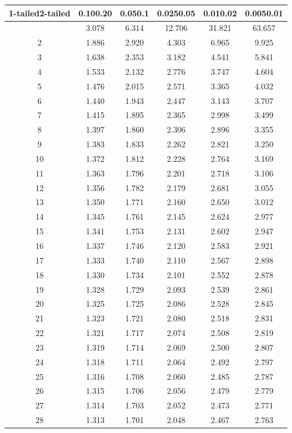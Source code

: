 \documentclass[
]{book}
\theoremstyle{definition}
\theoremstyle{definition}
\theoremstyle{definition}
\theoremstyle{definition}
\theoremstyle{remark}
\begin{document}
\begin{longtable}[]{@{}cccccc@{}}
\toprule\noalign{}
1-tailed2-tailed & 0.100.20 & 0.050.1 & 0.0250.05 & 0.010.02 & 0.0050.01 \\
\midrule\noalign{}
\endhead
\bottomrule\noalign{}
\endlastfoot
1 & 3.078 & 6.314 & 12.706 & 31.821 & 63.657 \\
2 & 1.886 & 2.920 & 4.303 & 6.965 & 9.925 \\
3 & 1.638 & 2.353 & 3.182 & 4.541 & 5.841 \\
4 & 1.533 & 2.132 & 2.776 & 3.747 & 4.604 \\
5 & 1.476 & 2.015 & 2.571 & 3.365 & 4.032 \\
6 & 1.440 & 1.943 & 2.447 & 3.143 & 3.707 \\
7 & 1.415 & 1.895 & 2.365 & 2.998 & 3.499 \\
8 & 1.397 & 1.860 & 2.306 & 2.896 & 3.355 \\
9 & 1.383 & 1.833 & 2.262 & 2.821 & 3.250 \\
10 & 1.372 & 1.812 & 2.228 & 2.764 & 3.169 \\
11 & 1.363 & 1.796 & 2.201 & 2.718 & 3.106 \\
12 & 1.356 & 1.782 & 2.179 & 2.681 & 3.055 \\
13 & 1.350 & 1.771 & 2.160 & 2.650 & 3.012 \\
14 & 1.345 & 1.761 & 2.145 & 2.624 & 2.977 \\
15 & 1.341 & 1.753 & 2.131 & 2.602 & 2.947 \\
16 & 1.337 & 1.746 & 2.120 & 2.583 & 2.921 \\
17 & 1.333 & 1.740 & 2.110 & 2.567 & 2.898 \\
18 & 1.330 & 1.734 & 2.101 & 2.552 & 2.878 \\
19 & 1.328 & 1.729 & 2.093 & 2.539 & 2.861 \\
20 & 1.325 & 1.725 & 2.086 & 2.528 & 2.845 \\
21 & 1.323 & 1.721 & 2.080 & 2.518 & 2.831 \\
22 & 1.321 & 1.717 & 2.074 & 2.508 & 2.819 \\
23 & 1.319 & 1.714 & 2.069 & 2.500 & 2.807 \\
24 & 1.318 & 1.711 & 2.064 & 2.492 & 2.797 \\
25 & 1.316 & 1.708 & 2.060 & 2.485 & 2.787 \\
26 & 1.315 & 1.706 & 2.056 & 2.479 & 2.779 \\
27 & 1.314 & 1.703 & 2.052 & 2.473 & 2.771 \\
28 & 1.313 & 1.701 & 2.048 & 2.467 & 2.763 \\

\end{longtable}
\end{document}
